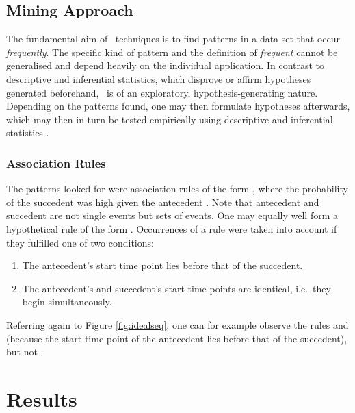 \subsection{Mining Approach}
\label{sec:mining}
The fundamental aim of \fpm\ techniques is to find patterns in a data set that occur \emph{frequently}. The specific kind of pattern and the definition of \emph{frequent} cannot be generalised and depend heavily on the individual application. In contrast to descriptive and inferential statistics, which disprove or affirm hypotheses generated beforehand, \fpm\ is of an exploratory, hypothesis-generating nature. Depending on the patterns found, one may then formulate hypotheses afterwards, which may then in turn be tested empirically using descriptive and inferential statistics \cite[]{rohlfing18,han12}.%

\subsubsection{Association Rules}
The patterns \citet{rohlfing18} looked for were association rules of the form , where the probability of the succedent  was high given the antecedent . Note that antecedent and succedent are not single events but sets of events. One may equally well form a hypothetical rule of the form . Occurrences of a rule were taken into account if they fulfilled one of two conditions:

\begin{enumerate}
	\item The antecedent's start time point lies before that of the succedent.
	\item The antecedent's and succedent's start time points are identical, i.e.\ they begin simultaneously.
\end{enumerate}

Referring again to Figure \ref{fig:idealseq}, one can for example observe the rules  and  (because the start time point of the antecedent lies before that of the succedent), but not .


\section{Results}

